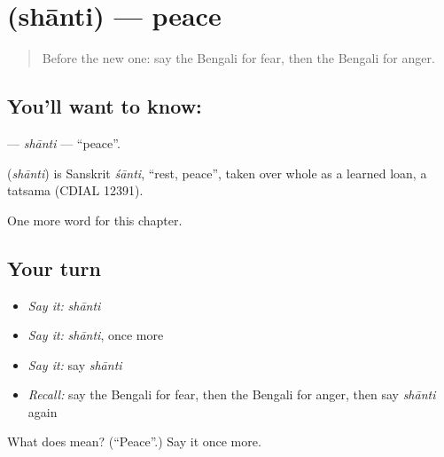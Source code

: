 \section[\texorpdfstring{\bn{শান্তি} (shānti)}{শান্তি (shānti)}]{ (shānti) — peace}

\label{lesson:BN-C169-shanti}



\begin{quote}
Before the new one: say the Bengali for fear, then the Bengali for anger.
\end{quote}

\subsection*{You'll want to know: }
\textbf{} — \emph{shānti} — \textquotedblleft{}peace\textquotedblright{}.

\begin{cousinweb}
\textbf{} (\emph{shānti}) is Sanskrit \emph{śānti}, \textquotedblleft{}rest, peace\textquotedblright{}, taken over whole as a learned loan, a tatsama (CDIAL 12391).
\end{cousinweb}

\begin{grammarlens}[title={What you've built}]
One more word for this chapter.
\end{grammarlens}

\subsection*{Your turn}
\begin{itemize}
\raggedright
  \item \emph{Say it:} \emph{shānti}
  \item \emph{Say it:} \emph{shānti}, once more
  \item \emph{Say it:} say \emph{shānti}
  \item \emph{Recall:} say the Bengali for fear, then the Bengali for anger, then say \emph{shānti} again
\end{itemize}

\begin{tcolorbox}[breakable,colback=teal!4,colframe=teal!35!black,title={Before you move on}]
What does  mean? (\textquotedblleft{}Peace\textquotedblright{}.) Say it once more.
\end{tcolorbox}
